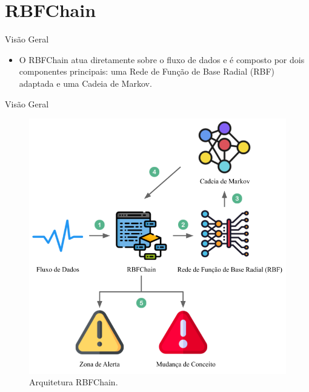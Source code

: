 \documentclass[10pt]{beamer}
\begin{document}
\section{RBFChain}

\begin{frame}{Visão Geral}
    \begin{itemize}
        \item<1 -> O RBFChain atua diretamente sobre o fluxo de dados e é composto por dois componentes principais: uma Rede de Função de Base Radial (RBF) adaptada e uma Cadeia de Markov.
      \end{itemize}
\end{frame}

\begin{frame}{Visão Geral}
        \begin{figure}[H]
            \begin{center}
                \includegraphics[scale=0.4]{imagens/arquitetura_rbfchain.png}
                \caption{Arquitetura RBFChain.}
                \label{fig:arquitetura}
            \end{center}
        \end{figure}
\end{frame}
\end{document}

